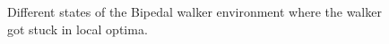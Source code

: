 \begin{figure}[!ht]
    \centering
    \begin{subfigure}{.3\textwidth}
        \centering
    \end{subfigure}
    \hspace{1em}
    \begin{subfigure}{.3\textwidth}
        \centering
    \end{subfigure}
    \hspace{1em}
    \begin{subfigure}{.3\textwidth}
        \centering
    \end{subfigure}
    \caption{Different states of the Bipedal walker environment where the walker got stuck in local optima.}
    \label{fig:bipedal_walker_local}
\end{figure}





 